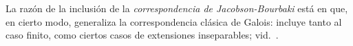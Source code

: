 \documentclass[11pt, reqno]{amsart}
\begin{document}
La razón de la inclusión de la \emph{correspondencia de Jacobson-Bourbaki} está en que, en cierto modo, generaliza la correspondencia
clásica de Galois: incluye tanto al caso finito, como ciertos casos de extensiones inseparables; vid.\ \cite{jacobson:galois}.

\begin{comment}
\section{Teoría de Galois profinita}
Hay, asimismo,
\lookup
una generalización de la teoría de Galois al caso infinito, para la cual se requiere de la noción categorial de <<límite
inverso>> (vid.\ \cite[490]{aluffi:algebra});
daremos primero un contraejemplo ilustrativo y opcional:
\begin{enumerate}[A., ref=\Alph*]
	\item\label{ex:galois_as_inv_lim}
		Sea $K/k$ una extensión algebraica de Galois posiblemente infinita.
		Vamos a considerar el \emph{conjunto dirigido} (o <<categoría de índices>>) $\mathscr{I}$ cuyos objetos son subextensiones $k
		\subseteq F \subseteq K$ de Galois \emph{finitas}, donde $F \le F'$ (o donde hay una única flecha $F \to F'$) syss
		$F \subseteq F'$.
		Tenemos el sistema inverso (o <<funtor contravariante>>) donde $\rho^{F'}_{F} \colon \Gal(F'/k) \epicto \Gal(F/k)$ es la
		restricción para $F \le F' \in \mathscr{I}$.
		Pruebe que
		\[
			\Gal(K/k) = \liminv_{F \in \mathscr{I}} \Gal(F/k),
		\]

	\item Definamos $\Z_\ell$, el anillo de enteros $\ell$-ádicos, como el límite inverso del diagrama $\rho^n_{n-1}\colon \Z/\ell^n\Z \to
		\Z/\ell^{n-1}\Z$ (dado por $n \mod{\ell^n} \mapsto n \mod{\ell^{n-1}}$) con el conjunto dirigido $(\N, \le)$.
		Pruebe que
		\[
			\Gal(\algcl\Fp/\Fp) \cong \prod_{\ell} \Z_\ell =: \hat{\Z},
		\]
		donde $\ell$ recorre todos los números primos.


\end{comment}
\end{document}
